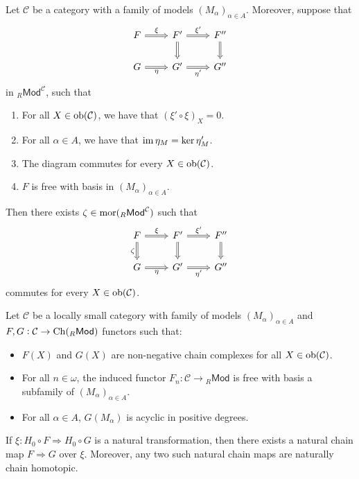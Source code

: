 \begin{proposition}
	Let $\mathcal{C}$ be a category with a family of models $(M_\alpha)_{\alpha \in A}$. Moreover, suppose that 
	\begin{equation*}
		\begin{tikzcd}
			F \arrow[r,"\xi",Rightarrow] & F' \arrow[r,"\xi'",Rightarrow]\arrow[d,Rightarrow] & F''\arrow[d,Rightarrow]\\
			G \arrow[r,"\eta"',Rightarrow] & G' \arrow[r,"\eta'"',Rightarrow] & G''
		\end{tikzcd}
	\end{equation*}
	\noindent in $_{R}\mathsf{Mod}^\mathcal{C}$, such that
	\begin{enumerate}[label = \textup{(}\alph*\textup{)},wide=0pt]
		\item For all $X \in \operatorname{ob}(\mathcal{C})$, we have that $(\xi' \circ \xi)_X = 0$.
		\item For all $\alpha \in A$, we have that $\operatorname{im} \eta_M = \ker \eta'_M$.
		\item The diagram commutes for every $X \in \operatorname{ob}(\mathcal{C})$.
		\item $F$ is free with basis in $(M_\alpha)_{\alpha \in A}$.
	\end{enumerate}
	Then there exists $\zeta \in \operatorname{mor}(_{R}\mathsf{Mod}^\mathcal{C})$ such that 
	\begin{equation*}
		\begin{tikzcd}
			F \arrow[r,"\xi",Rightarrow]\arrow[d,"\zeta"',Rightarrow] & F' \arrow[r,"\xi'",Rightarrow]\arrow[d,Rightarrow] & F''\arrow[d,Rightarrow]\\
			G \arrow[r,"\eta"',Rightarrow] & G' \arrow[r,"\eta'"',Rightarrow] & G''
		\end{tikzcd}
	\end{equation*}
	\noindent commutes for every $X \in \operatorname{ob}(\mathcal{C})$.	
\end{proposition}

\begin{theorem}
	Let $\mathcal{C}$ be a locally small category with family of models $(M_\alpha)_{\alpha \in A}$ and $F,G : \mathcal{C} \to \operatorname{Ch}(_{R}\mathsf{Mod})$ functors such that:
	\begin{itemize}[wide=0pt]
		\item $F(X)$ and $G(X)$ are non-negative chain complexes for all $X \in \operatorname{ob}(\mathcal{C})$.
		\item For all $n \in \omega$, the induced functor $F_n : \mathcal{C} \to {_{R}\mathsf{Mod}}$ is free with basis a subfamily of $(M_\alpha)_{\alpha \in A}$.
		\item For all $\alpha \in A$, $G(M_\alpha)$ is acyclic in positive degrees.
	\end{itemize}
	If $\xi : H_0 \circ F \Rightarrow H_0 \circ G$ is a natural transformation, then there exists a natural chain map $F \Rightarrow G$ over $\xi$. Moreover, any two such natural chain maps are naturally chain homotopic.
	\label{thm:amt}
\end{theorem}

